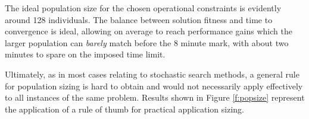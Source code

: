 
The ideal population size for the chosen operational constraints is evidently around 128 individuals. The balance between solution fitness and time to convergence is ideal, allowing on average to reach performance gains which the larger population can \emph{barely} match before the 8 minute mark, with about two minutes to spare on the imposed time limit.

Ultimately, as in most cases relating to stochastic search methods, a general rule for population sizing is hard to obtain and would not necessarily apply effectively to all instances of the same problem. Results shown in Figure \ref{f:popsize} represent the application of a rule of thumb for practical application sizing.


